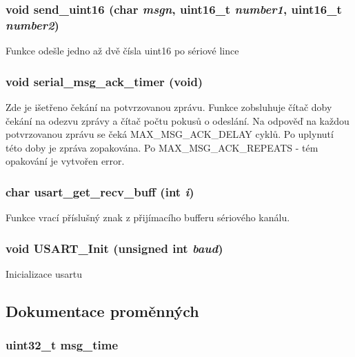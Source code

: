 \subsubsection[{send\_\-uint16}]{\setlength{\rightskip}{0pt plus 5cm}void send\_\-uint16 (char {\em msgn}, \/  uint16\_\-t {\em number1}, \/  uint16\_\-t {\em number2})}\label{usart_8h_aae4c07a844ed5fbcb7284bc9cd8b2831}
Funkce odešle jedno až dvě čísla uint16 po sériové lince 
\subsubsection[{serial\_\-msg\_\-ack\_\-timer}]{\setlength{\rightskip}{0pt plus 5cm}void serial\_\-msg\_\-ack\_\-timer (void)}\label{usart_8h_aeeeece096429d4491b2992685be8f0c6}
Zde je išetřeno čekání na potvrzovanou zprávu. Funkce zobsluhuje čítač doby čekání na odezvu zprávy a čítač počtu pokusů o odeslání. Na odpověď na každou potvrzovanou zprávu se čeká MAX\_\-MSG\_\-ACK\_\-DELAY cyklů. Po uplynutí této doby je zpráva zopakována. Po MAX\_\-MSG\_\-ACK\_\-REPEATS -\/ tém opakování je vytvořen error. 
\subsubsection[{usart\_\-get\_\-recv\_\-buff}]{\setlength{\rightskip}{0pt plus 5cm}char usart\_\-get\_\-recv\_\-buff (int {\em i})}\label{usart_8h_a5ac8e318d028590a813919560a120742}


Funkce vrací příslušný znak z přijímacího bufferu sériového kanálu. 
\subsubsection[{USART\_\-Init}]{\setlength{\rightskip}{0pt plus 5cm}void USART\_\-Init (unsigned int {\em baud})}\label{usart_8h_ac6ebeb4ed2c70b120906228519a9c246}
Inicializace usartu 

\subsection{Dokumentace proměnných}
\subsubsection[{msg\_\-time}]{\setlength{\rightskip}{0pt plus 5cm}uint32\_\-t {\bf msg\_\-time}}\label{usart_8h_a35cefd336a24746f2d8203c9fabf54c6}
